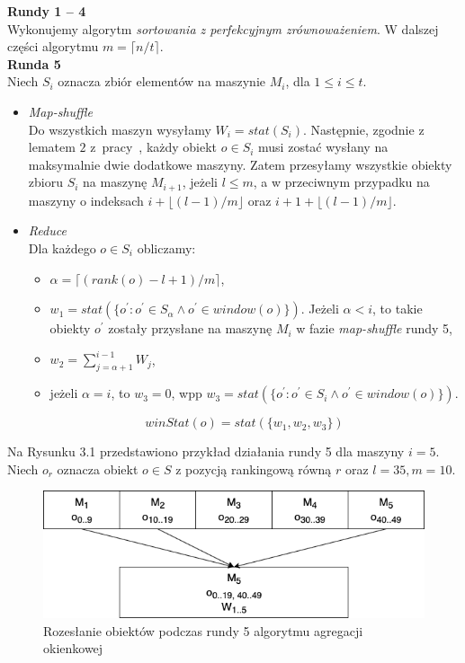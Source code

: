 \documentclass[magisterska]{pracamgr}
\begin{document}
\textbf{Rundy 1 -- 4} \\
Wykonujemy algorytm \textit{sortowania z perfekcyjnym zrównoważeniem}. W dalszej części algorytmu \(m = \lceil n / t \rceil\). \\
\newpage
\textbf{Runda 5} \\
Niech \(S_i\) oznacza zbiór elementów na maszynie \(M_i\), dla \(1 \leq i \leq t\).

\begin{itemize}
    \item \textit{Map-shuffle} \\
     Do wszystkich maszyn wysyłamy \(W_i = stat(S_i)\). Następnie, zgodnie z lematem \(2\) z~\mbox{pracy \cite{tao2013minimal}}, każdy obiekt \(o \in S_i\) musi zostać wysłany na maksymalnie dwie dodatkowe maszyny. Zatem przesyłamy wszystkie obiekty zbioru \(S_i\) na maszynę \(M_{i+1}\), jeżeli \(l \leq m\), a w przeciwnym przypadku na maszyny o indeksach \(i + \lfloor (l - 1) / m \rfloor\) oraz \(i+1+\lfloor (l-1)/m \rfloor \).
    
    \item \textit{Reduce} \\
    Dla każdego \(o \in S_i\) obliczamy:
    \begin{itemize}
        \item \(\alpha = \lceil (rank(o) - l + 1) / m \rceil\),
        \item \(w_1 = stat(\{o^\prime : o^\prime \in S_\alpha \wedge o^\prime \in window(o)\})\). Jeżeli \(\alpha < i \), to takie obiekty \(o^\prime\) zostały przysłane na maszynę \(M_i\) w fazie \textit{map-shuffle} rundy 5,
        \item $w_2 = \sum_{j=\alpha+1}^{i-1} W_j$,
        \item jeżeli \(\alpha = i\), to \(w_3 = 0\), wpp \(w_3 = stat(\{o^\prime : o^\prime \in S_i \wedge o^\prime \in window(o)\})\).
    \end{itemize}
    
    $$winStat(o) = stat(\{w_1, w_2, w_3\})$$
\end{itemize}

 Na Rysunku 3.1 przedstawiono przykład działania rundy 5 dla maszyny \(i = 5\). Niech \(o_{r}\) oznacza obiekt \(o \in S\) z pozycją rankingową równą \(r\) oraz \(l = 35, m = 10\).

\begin{figure}[H]
    \caption{Rozesłanie obiektów podczas rundy 5 algorytmu agregacji okienkowej}
    \includegraphics[width=15cm]{sliding_agg.png}
\end{figure}
\end{document}
